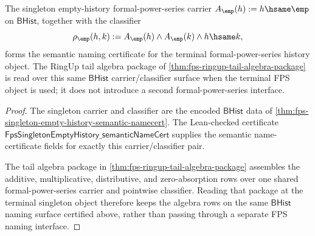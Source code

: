 
\begin{theorem}
\label{thm:fps-singleton-empty-history-semantic-certificate}
The singleton empty-history formal-power-series carrier
$A_{\emp}(h):=h\hsame\emp$ on $\mathsf{BHist}$, together with the classifier
$$
\rho_{\emp}(h,k):=A_{\emp}(h)\land A_{\emp}(k)\land h\hsame k,
$$
forms the semantic naming certificate for the terminal formal-power-series
history object. The RingUp tail algebra package of
\autoref{thm:fps-ringup-tail-algebra-package} is read over this same
$\mathsf{BHist}$ carrier/classifier surface when the terminal FPS object is
used; it does not introduce a second formal-power-series interface.
\end{theorem}
\begin{proof}
The singleton carrier and classifier are the encoded
$\mathsf{BHist}$ data of \autoref{thm:fps-singleton-empty-history-semantic-namecert}.
The Lean-checked certificate
$\mathsf{FpsSingletonEmptyHistory\_semanticNameCert}$ supplies the semantic
name-certificate fields for exactly this carrier/classifier pair.

The tail algebra package in \autoref{thm:fps-ringup-tail-algebra-package}
assembles the additive, multiplicative, distributive, and zero-absorption rows
over one shared formal-power-series carrier and pointwise classifier. Reading
that package at the terminal singleton object therefore keeps the algebra rows
on the same $\mathsf{BHist}$ naming surface certified above, rather than
passing through a separate FPS naming interface.
\end{proof}

